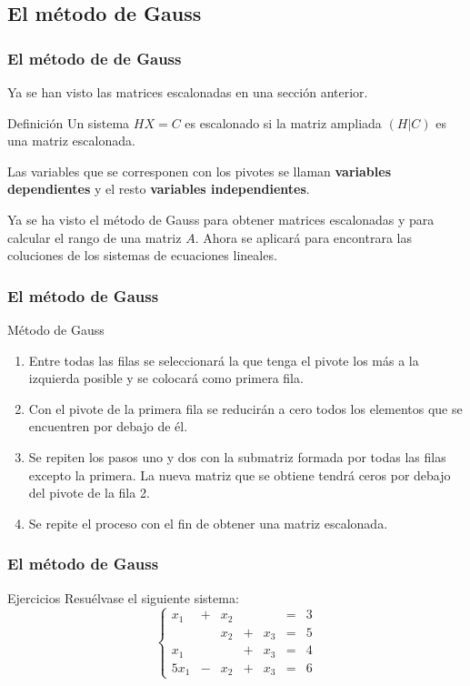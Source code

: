 \documentclass[aspectratio=169]{beamer}
\begin{document}
  \subsection{El m\'etodo de Gauss}

               \begin{frame}
    \frametitle{El m\'etodo de de Gauss}
    Ya se han visto las matrices escalonadas en una secci\'on anterior. 
       \begin{block}{Definici\'on}
Un sistema $HX=C$ es escalonado si la matriz ampliada $(H|C)$ es una matriz escalonada.

Las variables que se corresponen con los pivotes se llaman \textbf{variables dependientes} y el resto \textbf{variables independientes}.
\end{block}

Ya se ha visto el m\'etodo de Gauss para obtener matrices escalonadas y para calcular el rango de una matriz $A$. Ahora se aplicar\'a para encontrara las coluciones de los sistemas de ecuaciones lineales.
  \end{frame} 
  
               \begin{frame}
    \frametitle{El m\'etodo de Gauss}
       \begin{block}{M\'etodo de Gauss}
\begin{enumerate}
\item Entre todas las filas se seleccionar\'a la que tenga el pivote los m\'as a la izquierda posible y se colocar\'a como primera fila.
\item Con el pivote de la primera fila se reducir\'an a cero todos los elementos que se encuentren por debajo de \'el.
\item Se repiten los pasos uno y dos con la submatriz formada por todas las filas excepto la primera. La nueva matriz que se obtiene tendr\'a ceros por debajo del pivote de la fila 2.
\item Se repite el proceso con el fin de obtener una matriz escalonada.
\end{enumerate}
\end{block}
  \end{frame} 
  

\begin{frame}
\frametitle{El m\'etodo de Gauss}
\begin{block}{Ejercicios}
Resu\'elvase el siguiente sistema:
\[
\left\{\begin{array}{ccccccc}x_1 & + & x_2 &   &   & = & 3 \\  &   & x_2 & + & x_3 & = & 5 \\x_1 &   &   & + & x_3 & = & 4 \\5x_1 & - & x_2 & + & x_3 & = & 6\end{array}\right.
\]

\end{block}
  \end{frame} 
  
\end{document}
